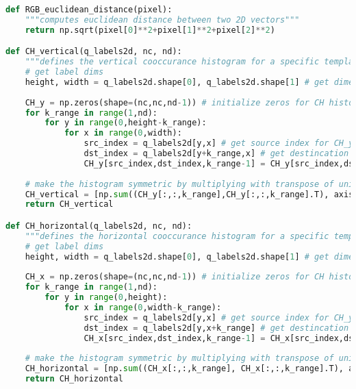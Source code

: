 \begin{lstlisting}[language=Python, caption={Additional functions for Co-occurrence Histogram Detection}, captionpos=b, label={lst:supportCH}]
def RGB_euclidean_distance(pixel):
    """computes euclidean distance between two 2D vectors"""
    return np.sqrt(pixel[0]**2+pixel[1]**2+pixel[2]**2)

def CH_vertical(q_labels2d, nc, nd):
    """defines the vertical cooccurance histogram for a specific template according to quantized colourspace labels matrix and distances"""
    # get label dims
    height, width = q_labels2d.shape[0], q_labels2d.shape[1] # get dimensions
    
    CH_y = np.zeros(shape=(nc,nc,nd-1)) # initialize zeros for CH histogram according to quantizations size
    for k_range in range(1,nd):
        for y in range(0,height-k_range):
            for x in range(0,width):
                src_index = q_labels2d[y,x] # get source index for CH_y at (y,x)
                dst_index = q_labels2d[y+k_range,x] # get destincation index for CH_y at (y+k,x)
                CH_y[src_index,dst_index,k_range-1] = CH_y[src_index,dst_index,k_range-1] + 1 # update histogram count in bin (src_index,dst_index)
                
    # make the histogram symmetric by multiplying with transpose of unidirectional cooccurance histogram
    CH_vertical = [np.sum((CH_y[:,:,k_range],CH_y[:,:,k_range].T), axis=0) for k_range in range(0,nd-1)]
    return CH_vertical

def CH_horizontal(q_labels2d, nc, nd):
    """defines the horizontal cooccurance histogram for a specific template according to quantized colourspace labels matrix and distances"""
    # get label dims
    height, width = q_labels2d.shape[0], q_labels2d.shape[1] # get dimensions
    
    CH_x = np.zeros(shape=(nc,nc,nd-1)) # initialize zeros for CH histogram according to quantizations size
    for k_range in range(1,nd):
        for y in range(0,height):
            for x in range(0,width-k_range):
                src_index = q_labels2d[y,x] # get source index for CH_y at (y,x)
                dst_index = q_labels2d[y,x+k_range] # get destincation index for CH_y at (y+k,x)
                CH_x[src_index,dst_index,k_range-1] = CH_x[src_index,dst_index,k_range-1] + 1 # update histogram count in bin (src_index,dst_index)
    
    # make the histogram symmetric by multiplying with transpose of unidirectional cooccurance histogram
    CH_horizontal = [np.sum((CH_x[:,:,k_range], CH_x[:,:,k_range].T), axis=0) for k_range in range(0,nd-1)]
    return CH_horizontal


\end{lstlisting}
